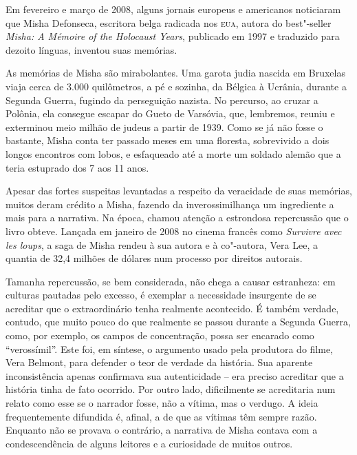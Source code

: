 Em fevereiro e março de 2008, alguns jornais europeus e americanos
noticiaram que Misha Defonseca, escritora belga radicada nos
\textsc{eua}, autora do best"-seller \emph{Misha: A Mémoire of the
Holocaust Years}, publicado em 1997 e traduzido para dezoito línguas,
inventou suas memórias.

As memórias de Misha são mirabolantes. Uma garota judia nascida em
Bruxelas viaja cerca de 3.000 quilômetros, a pé e sozinha, da Bélgica à
Ucrânia, durante a Segunda Guerra, fugindo da perseguição nazista. No
percurso, ao cruzar a Polônia, ela consegue escapar do Gueto de
Varsóvia, que, lembremos, reuniu e exterminou meio milhão de judeus a
partir de 1939. Como se já não fosse o bastante, Misha conta ter passado
meses em uma floresta, sobrevivido a dois longos encontros com lobos, e
esfaqueado até a morte um soldado alemão que a teria estuprado dos 7 aos
11 anos.

Apesar das fortes suspeitas levantadas a respeito da veracidade de suas
memórias, muitos deram crédito a Misha, fazendo da inverossimilhança um
ingrediente a mais para a narrativa. Na época, chamou atenção a
estrondosa repercussão que o livro obteve. Lançada em janeiro de 2008 no
cinema francês como \emph{Survivre avec les loups}, a saga de Misha
rendeu à sua autora e à co"-autora, Vera Lee, a quantia de 32,4 milhões
de dólares num processo por direitos autorais.

Tamanha repercussão, se bem considerada, não chega a causar estranheza:
em culturas pautadas pelo excesso, é exemplar a necessidade insurgente
de se acreditar que o extraordinário tenha realmente acontecido. É
também verdade, contudo, que muito pouco do que realmente se passou
durante a Segunda Guerra, como, por exemplo, os campos de concentração,
possa ser encarado como ``verossímil''. Este foi, em síntese, o
argumento usado pela produtora do filme, Vera Belmont, para defender o
teor de verdade da história. Sua aparente inconsistência apenas
confirmava sua autenticidade -- era preciso acreditar que a história
tinha de fato ocorrido. Por outro lado, dificilmente se acreditaria num
relato como esse se o narrador fosse, não a vítima, mas o
verdugo. A ideia frequentemente difundida é, afinal, a de que as vítimas
têm sempre razão. Enquanto não se provava o contrário, a narrativa de
Misha contava com a condescendência de alguns leitores e a curiosidade
de muitos outros.


